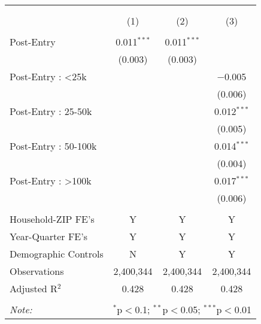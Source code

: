 
\begin{table}[!htbp] \centering 
  \caption{} 
  \label{} 
\begin{tabular}{@{\extracolsep{5pt}}lccc} 
\\[-1.8ex]\hline 
\hline \\[-1.8ex] 
\\[-1.8ex] & (1) & (2) & (3)\\ 
\hline \\[-1.8ex] 
 Post-Entry & 0.011$^{***}$ & 0.011$^{***}$ &  \\ 
  & (0.003) & (0.003) &  \\ 
  Post-Entry : <25k &  &  & $-$0.005 \\ 
  &  &  & (0.006) \\ 
  Post-Entry : 25-50k &  &  & 0.012$^{***}$ \\ 
  &  &  & (0.005) \\ 
  Post-Entry : 50-100k &  &  & 0.014$^{***}$ \\ 
  &  &  & (0.004) \\ 
  Post-Entry : >100k &  &  & 0.017$^{***}$ \\ 
  &  &  & (0.006) \\ 
 \hline \\[-1.8ex] 
Household-ZIP FE's & Y & Y & Y \\ 
Year-Quarter FE's & Y & Y & Y \\ 
Demographic Controls & N & Y & Y \\ 
Observations & 2,400,344 & 2,400,344 & 2,400,344 \\ 
Adjusted R$^{2}$ & 0.428 & 0.428 & 0.428 \\ 
\hline 
\hline \\[-1.8ex] 
\textit{Note:}  & \multicolumn{3}{l}{$^{*}$p$<$0.1; $^{**}$p$<$0.05; $^{***}$p$<$0.01} \\ 
\end{tabular} 
\end{table} 
